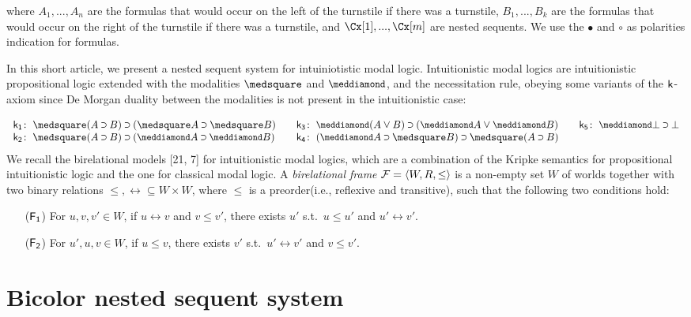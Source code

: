 \documentclass{easychair}
\begin{document}
where $A_{1}, . . . , A_{n}$ are the formulas that would occur on the left of the turnstile if there was a turnstile, $B_{1}, . . . , B_{k}$ are the formulas that would occur on the right of the turnstile if there was a turnstile, and $\Cx[1], . . . , \Cx[m]$ are nested sequents. We use the $\bullet$ and $\circ$ as polarities indication for formulas.

In this short article, we present a nested sequent system for intuiniotistic modal logic. Intuitionistic modal logics are intuitionistic propositional logic extended with the modalities $\BOX$ and $\DIA$, and the necessitation rule, obeying some variants of the $\mathsf{k_{}}$-axiom since De Morgan duality between the modalities is not present in the intuitionistic case:

\begin{equation*}
\label{eq:ik}%
\begin{array}[t]{r@{\;}l@{\qquad}r@{\;}l@{\qquad}r@{\;}l}
\kax[1]\colon&\BOX(A\IMP B)\IMP(\BOX A\IMP\BOX B)
&
\kax[3]\colon&\DIA(A\OR B)\IMP(\DIA A\OR\DIA B)
&
\kax[5]\colon&\DIA\BOT\IMP\BOT
\\
\kax[2]\colon&\BOX(A\IMP B)\IMP(\DIA A\IMP\DIA B)
&
\kax[4]\colon&(\DIA A\IMP \BOX B)\IMP\BOX(A\IMP B)\\%
\end{array}
\end{equation*}
We recall the birelational models [21, 7] for intuitionistic modal logics, which are a combination of the Kripke semantics for propositional intuitionistic logic and the one for classical modal logic. A \emph{birelational frame} $\mathcal{F} = \langle W, R, \le \rangle$ is a non-empty set $W$ of worlds together with two binary relations $\le, \rel \subseteq W \times W$, where $\le$ is a preorder(i.e., reflexive and transitive), such that the following two conditions hold:

\begin{enumerate}
	\item[($\mathsf{F_1}$)] For $u, v, v' \in W$, if $u \rel v$ and $v \le v'$, there exists $u'$ s.t.~$u \le u'$ and $u' \rel v'$.
	
	\item[($\mathsf{F_2}$)] For $u', u, v \in W$, if $u \le v$, there exists $v'$ s.t.~$u' \rel v'$ and $v\le v'$.
\end{enumerate}

\section{Bicolor nested sequent system}
\end{document}
